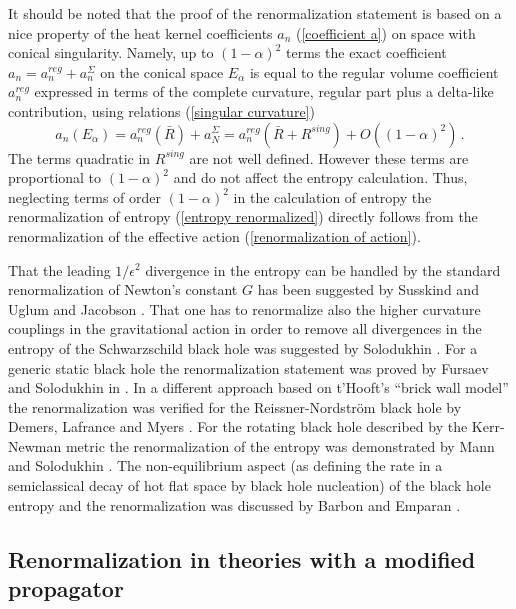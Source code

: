 \documentclass[12pt]{article}
\begin{document}
It should be noted that  the proof of the renormalization statement is based
on a nice property of  the heat kernel coefficients $a_n$ (\ref{coefficient a}) on space with conical singularity.  Namely,  up to
$(1-\alpha)^2$ terms the exact coefficient
$a_n=a_n^{reg}+a_n^\Sigma$   on the conical space  $E_\alpha$ is
equal to the regular volume coefficient
${a}_n^{reg}$ expressed in terms of the complete curvature, regular part plus a delta-like contribution,
using relations (\ref{singular curvature})
\begin{equation}
a_n (E_\alpha )=   a^{reg}_n(\bar{R})+a^\Sigma_N={a}^{reg}_n (\bar{R}+R^{sing}) +
O((1-\alpha)^2)\, .
\label{nice relation}
\end{equation}
The terms quadratic in $R^{sing}$ are not well defined. However these terms are proportional to $(1-\alpha)^2$ and do not
affect the entropy calculation. 
Thus,  neglecting   terms of order $(1-\alpha)^2$ in the calculation of entropy the renormalization of entropy
(\ref{entropy renormalized})
directly follows from the renormalization of the effective action
(\ref{renormalization of action}).


That the leading $1/\epsilon^2$ divergence in the entropy can be handled by the standard renormalization of  Newton's constant $G$ has  been suggested by Susskind and Uglum \cite{Susskind:1994sm} and Jacobson
\cite{Jacobson:1994iw}.
That one has to renormalize also the  higher curvature couplings in the gravitational action in order to remove all divergences in the entropy of the Schwarzschild black hole was suggested by Solodukhin 
\cite{Solodukhin:1994yz}.  For a generic static black hole the renormalization statement 
was proved  by Fursaev and Solodukhin in  \cite{Fursaev:1994ea}. In a different approach based on t'Hooft's ``brick wall model'' the renormalization was verified
for the Reissner-Nordstr\"{o}m black hole by Demers,  Lafrance and Myers \cite{Demers:1995dq}. For the rotating black hole described by the Kerr-Newman metric the renormalization of the entropy was demonstrated by Mann and Solodukhin \cite{Mann:1996bi}. The non-equilibrium aspect (as defining the rate in a semiclassical decay of hot flat space by black hole
nucleation) of the black hole entropy and the renormalization was discussed by Barbon and Emparan \cite{Barbon:1995im}. 

\subsection{Renormalization in theories with a modified propagator}
\label{section: theories with a modified propagator, covariant}
\end{document}

